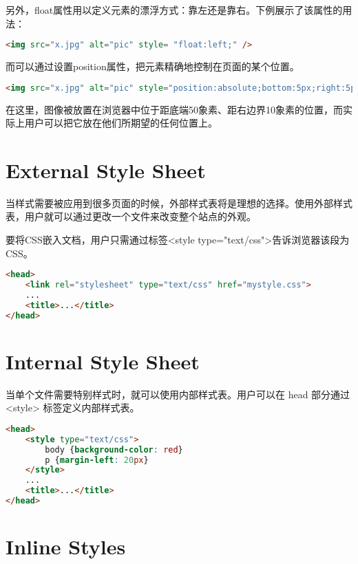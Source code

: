 另外，float属性用以定义元素的漂浮方式：靠左还是靠右。下例展示了该属性的用法：

\begin{lstlisting}[language=HTML]
<img src="x.jpg" alt="pic" style= "float:left;" />
\end{lstlisting}

而可以通过设置position属性，把元素精确地控制在页面的某个位置。

\begin{lstlisting}[language=HTML]
<img src="x.jpg" alt="pic" style="position:absolute;bottom:5px;right:5px;" />
\end{lstlisting}

在这里，图像被放置在浏览器中位于距底端50象素、距右边界10象素的位置，而实际上用户可以把它放在他们所期望的任何位置上。

\section{External Style Sheet}


当样式需要被应用到很多页面的时候，外部样式表将是理想的选择。使用外部样式表，用户就可以通过更改一个文件来改变整个站点的外观。

要将CSS嵌入文档，用户只需通过标签<style type="text/css">告诉浏览器该段为CSS。

\begin{lstlisting}[language=HTML]
<head>
	<link rel="stylesheet" type="text/css" href="mystyle.css">
	...
	<title>...</title>
</head>
\end{lstlisting}




\section{Internal Style Sheet}


当单个文件需要特别样式时，就可以使用内部样式表。用户可以在 head 部分通过 <style> 标签定义内部样式表。


\begin{lstlisting}[language=HTML]
<head>
	<style type="text/css">
		body {background-color: red}
		p {margin-left: 20px}
	</style>
	...
	<title>...</title>
</head>
\end{lstlisting}



\section{Inline Styles}

